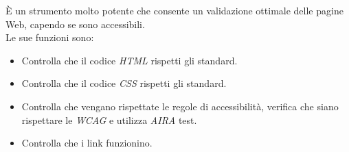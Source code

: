 È un strumento molto potente che consente un validazione ottimale delle pagine Web, capendo se sono accessibili.\\
Le sue funzioni sono:
\begin{itemize}
	\item Controlla che il codice \emph{HTML} rispetti gli standard.
	\item Controlla che il codice \emph{CSS} rispetti gli standard.
	\item Controlla che vengano rispettate le regole di accessibilità, verifica che siano rispettare le \emph{WCAG} e utilizza \emph{AIRA} test.
	\item Controlla che i link funzionino.
\end{itemize}